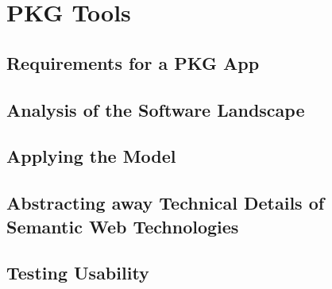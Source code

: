 \chapter{PKG Tools}

\section{Requirements for a PKG App}
\section{Analysis of the Software Landscape}
\section{Applying the Model}
\section{Abstracting away Technical Details of Semantic Web Technologies}
\section{Testing Usability}
